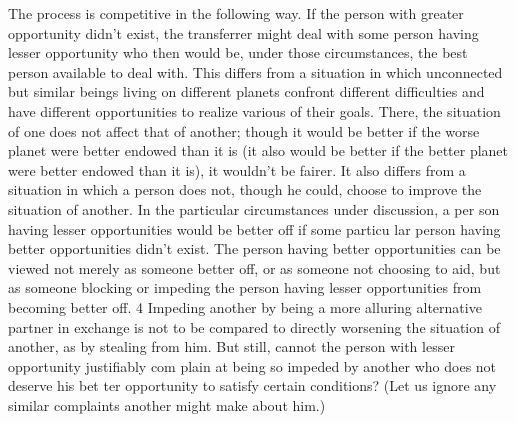 \documentclass[11pt,openany]{book}
\begin{document}
The process is competitive in the following way. If the person with greater opportunity didn't exist, the transferrer might deal with some person having lesser opportunity who then would be, under those circumstances, the best person available to deal with. This differs from a situation in which unconnected but similar beings living on different planets confront different difficulties and have different opportunities to realize various of their goals. There, the situation of one does not affect that of another; though it would be better if the worse planet were better endowed than it is (it also would be better if the better planet were better endowed than it is), it wouldn't be fairer. It also differs from a situation in which a person does not, though he could, choose to improve the situation of another. In the particular circumstances under discussion, a per son having lesser opportunities would be better off if some particu lar person having better opportunities didn't exist. The person having better opportunities can be viewed not merely as someone better off, or as someone not choosing to aid, but as someone blocking or impeding the person having lesser opportunities from becoming better off. 4 Impeding another by being a more alluring alternative partner in exchange is not to be compared to directly worsening the situation of another, as by stealing from him. But still, cannot the person with lesser opportunity justifiably com plain at being so impeded by another who does not deserve his bet ter opportunity to satisfy certain conditions? (Let us ignore any similar complaints another might make about him.) 
\end{document}
